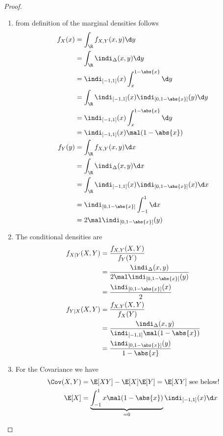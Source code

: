 \subsection{}
\begin{proof}
	\begin{enumerate}
		\item from definition of the marginal densities follows
		\begin{align*}
			f_X(x) &= \int_{\R} f_{X,Y} (x,y)\d y\\
			&= \int_{\R} \indi_{\Delta}(x,y)\d y\\
			&= \indi_{[-1,1]}(x)\int_x^{1-\abs{x}} \d y\\
			&= \int_{\R} \indi_{[-1,1]}(x)\indi_{[0,1-\abs{x}]}(y)\d y\\
			&= \indi_{[-1,1]}(x)\int_x^{1-\abs{x}}\d y\\
			&= \indi_{[-1,1]}(x)\mal (1-\abs{x})\\
			f_Y(y) &= \int_{\R} f_{X,Y}(x,y)\d x\\
			&= \int_{\R} \indi_{\Delta}(x,y)\d x\\
			&= \int_{\R}\indi_{[-1,1]}(x)\indi_{[0,1-\abs{x}]}(x)\d x\\
			&= \indi_{[0,1-\abs{x}]} \int_{-1}^1\d x\\
			&= 2\mal \indi_{[0,1-\abs{x}]}(y)
		\end{align*}
		\item The conditional densities are
		\begin{align*}
			f_{X\mid Y}(X,Y) &= \frac{f_{X,Y}(X,Y)}{f_Y(Y)}\\
			&= \frac{\indi_{\Delta}(x,y)}{2\mal \indi_{[0,1-\abs{x}]}(y)}\\
			&= \frac{\indi_{[0,1-\abs{x}]}(x)}{2}\\
			f_{Y\mid X}(X,Y) &= \frac{f_{X,Y}(X,Y)}{f_X(Y)}\\
			&= \frac{\indi_{\Delta}(x,y)}{\indi_{[-1,1]}\mal (1-\abs{x})}\\
			&= \frac{\indi_{[0,1-\abs{x}]}(y)}{1-\abs{x}}\\
		\end{align*}
		\item For the Covariance we have
		\begin{align*}
			\Cov(X,Y) &= \E[XY] -\E[X]\E[Y] = \E[XY] \text{ see below!}\\
			\E[X] &= \underbrace{\int_{-1}^1 x\mal (1-\abs{x})}_{=0}\indi_{[-1,1]}(x)\d x\\

\end{align*}
\end{enumerate}
\end{proof}
